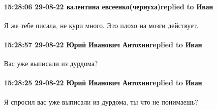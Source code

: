  
 
 
 
 

\paragraph{15:28:06 29-08-22 валентина евсеенко(чернуха)replied to Иван}

Я же тебе писала, не кури много. Это плохо на мозги действует.

\paragraph{15:28:57 29-08-22 Юрий Иванович Антохинreplied to Иван}
Вас уже выписали из дурдома?

\paragraph{15:28:25 29-08-22 Юрий Иванович Антохинreplied to Иван}

Я спросил вас уже выписали из дурдома, ты что не понимаешь?
